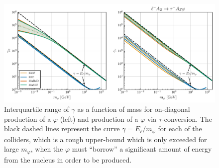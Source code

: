\begin{figure}[t!]
    \centering
    \includegraphics[width=\linewidth]{figures/chapter4/median_gamma.pdf}
    \caption[Interquartile range as a function of mass for boost distributions of scalars produced at various lepton-nucleus collision experiments.]{Interquartile range of $\gamma$ as a function of mass for on-diagonal production of a $\varphi$ (left) and production of a $\varphi$ via $\tau$-conversion. The black dashed lines represent the curve $\gamma = E_\ell/m_\varphi$ for each of the colliders, which is a rough upper-bound which is only exceeded for large $m_\varphi$, when the $\varphi$ must ``borrow'' a significant amount of energy from the nucleus in order to be produced.}
    \label{fig:boost_IQR}
\end{figure}


